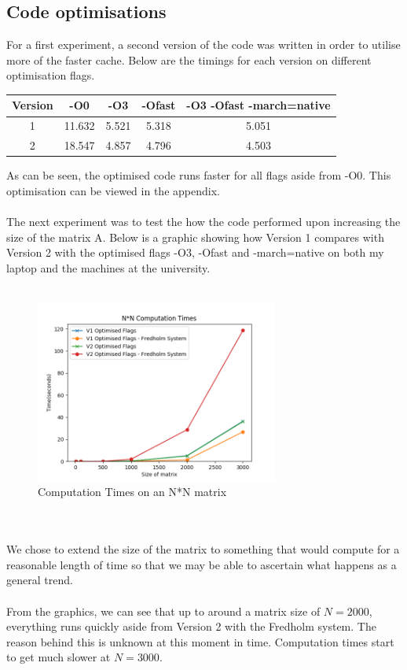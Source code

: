 \documentclass{article}
\begin{document}
\subsection{Code optimisations}
For a first experiment, a second version of the code was written in order to utilise more of the faster cache. Below are the timings for each version on different optimisation flags.
\begin{center}
    \begin{tabular}{|c|c|c|c|c|}
    \hline
    Version & -O0 & -O3 & -Ofast & -O3 -Ofast -march=native\\
    \hline
    1 & 11.632 & 5.521 & 5.318 & 5.051\\
    \hline
    2 & 18.547 & 4.857 & 4.796 & 4.503\\
    \hline
    \end{tabular}
\end{center}
As can be seen, the optimised code runs faster for all flags aside from -O0. This optimisation can be viewed in the appendix.
\\\\
The next experiment was to test the how the code performed upon increasing the size of the matrix A. Below is a graphic showing how Version 1 compares with Version 2 with the optimised flags -O3, -Ofast and -march=native on both my laptop and the machines at the university.
\\\\
\begin{figure}[htb]
\begin{center}
\includegraphics[width=8cm]{NN_comp_times.png}
\caption{Computation Times on an N*N matrix}
\end{center}
\end{figure}
\\\\
We chose to extend the size of the matrix to something that would compute for a reasonable length of time so that we may be able to ascertain what happens as a general trend.
\\\\
From the graphics, we can see that up to around a matrix size of $N = 2000$, everything runs quickly aside from Version 2 with the Fredholm system. The reason behind this is unknown at this moment in time. Computation times start to get much slower at $N = 3000$.
\end{document}
